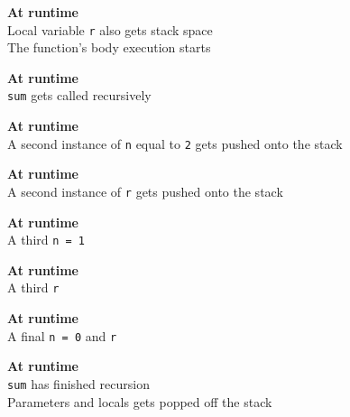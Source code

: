 \begin{frame}
\begin{overprint}
      \begin{center}
        \textbf{At runtime} \\ 
        Local variable \texttt{r} also gets stack space \\
        The function's body execution starts
      \end{center}

      \begin{center}
        \textbf{At runtime} \\ 
        \texttt{sum} gets called recursively
      \end{center}

      \begin{center}
        \textbf{At runtime} \\ 
        A second instance of \texttt{n} equal to \texttt{2} gets pushed onto the stack
      \end{center}

      \begin{center}
        \textbf{At runtime} \\ 
        A second instance of \texttt{r} gets pushed onto the stack
      \end{center}

      \begin{center}
        \textbf{At runtime} \\ 
        A third \texttt{n = 1}
      \end{center}

      \begin{center}
        \textbf{At runtime} \\ 
        A third \texttt{r}
      \end{center}

      \begin{center}
        \textbf{At runtime} \\ 
        A final \texttt{n = 0} and \texttt{r}
      \end{center}

      \begin{center}
        \textbf{At runtime} \\ 
        \texttt{sum} has finished recursion \\
        Parameters and locals gets popped off the stack
      \end{center}

  \end{overprint}
\end{frame}



